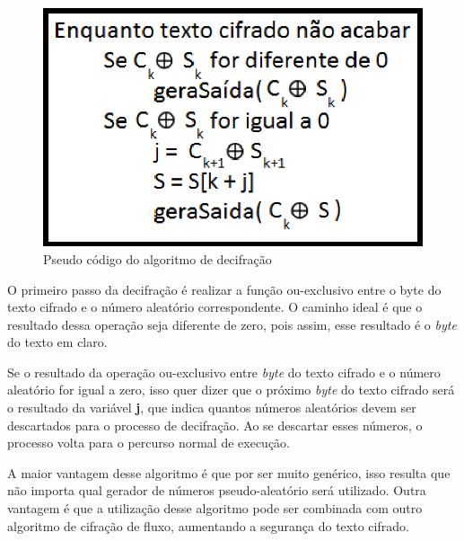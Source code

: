 \begin{figure}[h]
	\centering
	\includegraphics[scale=1]{figuras/funcionamento_Decifra.eps}
	\caption{Pseudo código do algoritmo de decifração}
	\label{pseudo-codigo-decifrar}
\end{figure}

O primeiro passo da decifração é realizar a função ou-exclusivo entre o byte do texto cifrado e o número aleatório correspondente. O caminho ideal é que o resultado dessa operação seja diferente de zero, pois assim, esse resultado é o \textit{byte} do texto em claro.

Se o resultado da operação ou-exclusivo entre \textit{byte} do texto cifrado e o número aleatório for igual a zero, isso quer dizer que o próximo \textit{byte} do texto cifrado será o resultado da variável \textbf{j}, que indica quantos números aleatórios devem ser descartados para o processo de decifração. Ao se descartar esses números, o processo volta para o percurso normal de execução. 

A maior vantagem desse algoritmo é que por ser muito genérico, isso resulta que não importa qual gerador de números pseudo-aleatório será utilizado. Outra vantagem é que a utilização desse algoritmo pode ser combinada com outro algoritmo de cifração de fluxo, aumentando a segurança do texto cifrado.
